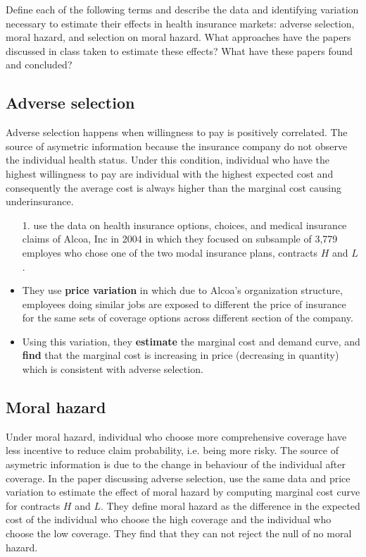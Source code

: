 \documentclass{article}
\begin{document}
Define each of the following terms and describe the data and identifying variation necessary to estimate their effects in health insurance markets: adverse selection, moral hazard, and selection on moral hazard. What approaches have the papers discussed in class taken to estimate these effects? What have these papers found and concluded?

\subsection*{Adverse selection}
Adverse selection happens when willingness to pay is positively correlated. The source of asymetric information because the insurance company do not observe the individual health status. Under this condition, individual who have the highest willingness to pay are individual with the highest expected cost and consequently the average cost is always higher than the marginal cost causing underinsurance. 

\begin{itemize}
    \item[1.] \textbf{\cite{einav2010estimating}} use the data on health insurance options, choices, and medical insurance claims of Alcoa, Inc in 2004 in which they focused on subsample of 3,779 employes who chose one of the two modal insurance plans, contracts $H$ and $L$. 
    \item They use \textbf{price variation} in which due to Alcoa's organization structure, employees doing similar jobs are exposed to different the price of insurance for the same sets of coverage options across different section of the company. 
    \item Using this variation, they \textbf{estimate} the marginal cost and demand curve, and \textbf{find} that the marginal cost is increasing in price (decreasing in quantity) which is consistent with adverse selection.
\end{itemize}

\subsection*{Moral hazard}
Under moral hazard, individual who choose more comprehensive coverage have less incentive to reduce claim probability, i.e. being more risky. The source of asymetric information is due to the change in behaviour of the individual after coverage. In the paper discussing adverse selection, \cite{einav2010estimating} use the same data and price variation to estimate the effect of moral hazard by computing marginal cost curve for contracts $H$ and $L$. They define moral hazard as the difference in the expected cost of the individual who choose the high coverage and the individual who choose the low coverage. They find that they can not reject the null of no moral hazard.
\end{document}
